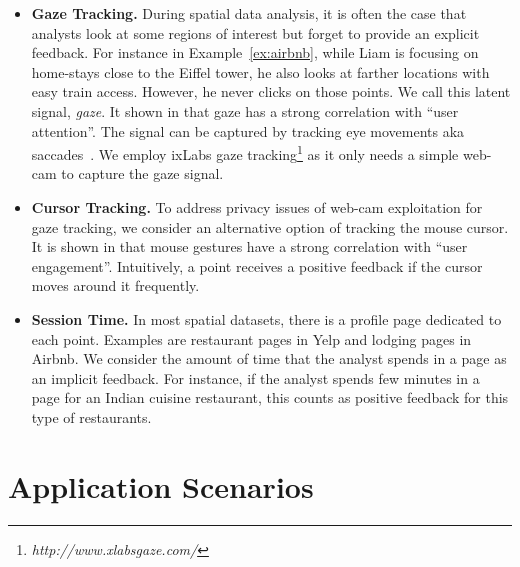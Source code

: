 \documentclass[conference,compsoc]{IEEEtran}
\begin{document}
\begin{itemize}[leftmargin=*]
\item {\bf Gaze Tracking.} During spatial data analysis, it is often the case that analysts look at some regions of interest but forget to provide an explicit feedback. For instance in Example~\ref{ex:airbnb}, while Liam is focusing on home-stays close to the Eiffel tower, he also looks at farther locations with easy train access. However, he never clicks on those points. We call this latent signal, {\em gaze}. It shown in \cite{fischer1999investigation} that gaze has a strong correlation with ``user attention''. The signal can be captured by tracking eye movements aka saccades~\cite{arapakis2014user}. We employ {\sc ixLabs} gaze tracking\footnote{\em http://www.xlabsgaze.com/} as it only needs a simple web-cam to capture the gaze signal.
\item {\bf Cursor Tracking.} To address privacy issues of web-cam exploitation for gaze tracking, we consider an alternative option of tracking the mouse cursor. It is shown in \cite{arapakis2014understanding} that mouse gestures have a strong correlation with ``user engagement''. Intuitively, a point receives a positive feedback if the cursor moves around it frequently.
\item {\bf Session Time.} In most spatial datasets, there is a profile page dedicated to each point. Examples are restaurant pages in Yelp and lodging pages in Airbnb. We consider the amount of time that the analyst spends in a page as an implicit feedback. For instance, if the analyst spends few minutes in a page for an Indian cuisine restaurant, this counts as positive feedback for this type of restaurants. 
\end{itemize}




\section{Application Scenarios}
\label{sec:scenario}
\end{document}
